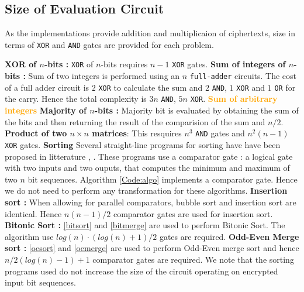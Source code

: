 \documentclass{acm_proc_article-sp}
\begin{document}
\subsection{Size of Evaluation Circuit}
As the implementations provide addition and multiplicaion of ciphertexts,  size in terms of \texttt{XOR} and \texttt{AND} gates are provided for each problem. 

\textbf{XOR of $n$-bits :} \texttt{XOR} of $n$-bits requires $n-1$ \texttt{XOR} gates. \newline
\textbf{Sum of integers of $n$-bits :} Sum of two integers is performed using an $n$ \texttt{full-adder} circuits. The cost of a full adder circuit is $2$ \texttt{XOR} to calculate the sum and $2$ \texttt{AND}, $1$ \texttt{XOR} and $1$ \texttt{OR} for the carry. Hence the total complexity is $3n$ \texttt{AND}, $5n$ \texttt{XOR}. \newline
\textcolor{orange}{\textbf{Sum of arbitrary integers}} \newline
\textbf{Majority of $n$-bits :} Majority bit is evaluated by obtaining the sum of the bits and then returning the result of the comparision of the sum and $n/2$. \newline \newline
\textbf{Product of two $n\times n$ matrices}: This resquires $n^3$ \texttt{AND} gates and \texttt{$n^2(n-1)$} \texttt{XOR} gates. \newline \newline
\textbf{Sorting} Several straight-line programs for sorting have have been proposed in litterature \cite{dk}, \cite{Batcher:1968:SNA:1468075.1468121}. These programs use a comparator gate : a logical gate with two inputs and two ouputs, that computes the minimum and maximum of two $n$ bit sequences. Algorithm \autoref{Code:algo} implements a comparator gate. Hence we do not need to perform any transformation for these algorithms.
\newline \newline
\textbf{Insertion sort :} When allowing for parallel comparators, bubble sort and insertion sort are identical. Hence $n(n-1)/2$ comparator gates are used for insertion sort.\newline \newline
\textbf{Bitonic Sort :} \autoref{bitsort} and \autoref{bitmerge} are used to perform Bitonic Sort. The algorithm use $log(n) · (log(n)+1) / 2 $ gates are required. \newline \newline
\textbf{Odd-Even Merge sort :} \autoref{oesort} and \autoref{oemerge} are used to perform Odd-Even merge sort and hence  $n/2(log(n)-1) + 1 $ comparator gates are required.\newline
We note that the sorting programs used do not increase the size of the circuit operating on encrypted input bit sequences.
\end{document}
